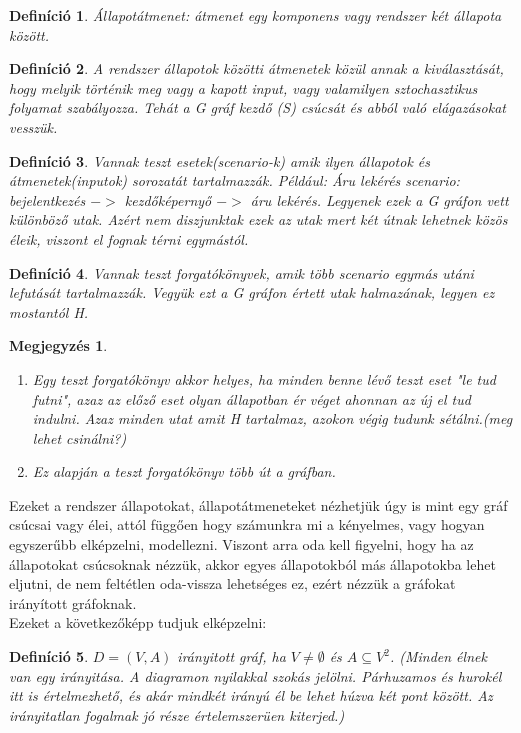 \documentclass[12pt]{article}
\newtheorem{defin}{Definíció}[section]
\newtheorem{megj}{Megjegyzés}[section]
\begin{document}
\begin{defin}
Állapotátmenet: átmenet egy komponens vagy rendszer két állapota között. ~\cite{htb:masterfield}
\end{defin}

\begin{defin}
A rendszer állapotok közötti átmenetek közül annak a kiválasztását, hogy melyik történik meg vagy a kapott input, vagy valamilyen sztochasztikus folyamat szabályozza. Tehát a G gráf kezdő (S) csúcsát és abból való elágazásokat vesszük.
\end{defin}

\begin{defin}
Vannak teszt esetek(scenario-k) amik ilyen állapotok és átmenetek(inputok) sorozatát tartalmazzák. Például: Áru lekérés scenario:  bejelentkezés $->$ kezdőképernyő $->$ áru lekérés. Legyenek ezek a G gráfon vett különböző utak. Azért nem diszjunktak ezek az utak mert két útnak lehetnek közös éleik, viszont el fognak térni egymástól.
\end{defin}

\begin{defin}
Vannak teszt forgatókönyvek, amik több scenario egymás utáni lefutását tartalmazzák. Vegyük ezt a G gráfon értett utak halmazának, legyen ez mostantól H.
\end{defin}

\begin{megj}
\begin{enumerate}
\item Egy teszt forgatókönyv akkor helyes, ha minden benne lévő teszt eset "le tud futni", azaz az előző eset olyan állapotban ér véget ahonnan az új el tud indulni. Azaz minden utat amit H tartalmaz, azokon végig tudunk sétálni.(meg lehet csinálni?)
\item Ez alapján a teszt forgatókönyv több út a gráfban.
\end{enumerate}
\end{megj}

Ezeket a rendszer állapotokat, állapotátmeneteket nézhetjük úgy is mint egy gráf csúcsai vagy élei, attól függően hogy számunkra mi a kényelmes, vagy hogyan egyszerűbb elképzelni, modellezni.
Viszont arra oda kell figyelni, hogy ha az állapotokat csúcsoknak nézzük, akkor egyes állapotokból más állapotokba lehet eljutni, de nem feltétlen oda-vissza lehetséges ez, ezért nézzük a gráfokat irányított gráfoknak.\\
Ezeket a következőképp tudjuk elképzelni:

\begin{defin}
$D = (V,A)$ irányitott gráf, ha $V \neq \emptyset$ és $A \subseteq V^2$. (Minden élnek van egy irányitása. A diagramon nyilakkal szokás jelölni. Párhuzamos és hurokél itt is értelmezhető, és akár mindkét irányú él be lehet húzva két pont között. Az irányitatlan fogalmak jó része értelemszerüen kiterjed.) ~\cite{szam:Fleiner}
\end{defin}
\end{document}
